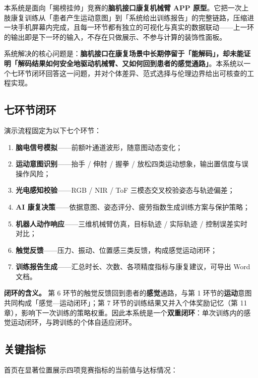 \documentclass[11pt, a4paper]{ctexart}
\begin{document}
本系统是面向「揭榜挂帅」竞赛的\textbf{脑机接口康复机械臂 APP 原型}。它把一次上肢康复训练从「患者产生运动意图」到「系统给出训练报告」的完整链路，压缩进一块手机屏幕内完成，且每一环节都有独立的可视化与真实的数据联动——上一环的输出即是下一环的输入，不存在只做展示、不参与计算的装饰性面板。

系统解决的核心问题是：\textbf{脑机接口在康复场景中长期停留于「能解码」，却未能证明「解码结果如何安全地驱动机械臂、又如何回到患者的感觉通路」}。本系统以一个七环节闭环回答这一问题，并对个体差异、范式选择与伦理边界给出可核查的工程实现。

\subsection{七环节闭环}

演示流程固定为以下七个环节：

\begin{enumerate}[itemsep=2pt, topsep=4pt]
  \item \textbf{脑电信号模拟}——前额叶通道波形，随意图动态变化；
  \item \textbf{运动意图识别}——抬手 / 伸肘 / 握拳 / 放松四类运动想象，输出置信度与误操作风险；
  \item \textbf{光电感知校验}——RGB / NIR / ToF 三模态交叉校验姿态与轨迹偏差；
  \item \textbf{AI 康复决策}——依据意图、姿态评分、疲劳指数生成训练方案与保护策略；
  \item \textbf{机器人动作响应}——三维机械臂仿真，目标轨迹 / 实际轨迹 / 控制误差实时对比；
  \item \textbf{触觉反馈}——压力、振动、位置感三类反馈，构成感觉运动闭环；
  \item \textbf{训练报告生成}——汇总时长、次数、各项精度指标与康复建议，可导出 Word 文档。
\end{enumerate}

\begin{keybox}
\textbf{闭环的含义。} 第 6 环节的触觉反馈回到患者的\textbf{感觉}通路，与第 1 环节的\textbf{运动}意图共同构成「感觉—运动闭环」；第 7 环节的训练结果又并入个体奖励记忆（第 11 章），影响下一次训练的策略权重。因此本系统是一个\textbf{双重闭环}：单次训练内的感觉运动闭环，与跨训练的个体自适应闭环。
\end{keybox}

\subsection{关键指标}

首页在显著位置展示四项竞赛指标的当前值与达标情况：
\end{document}
